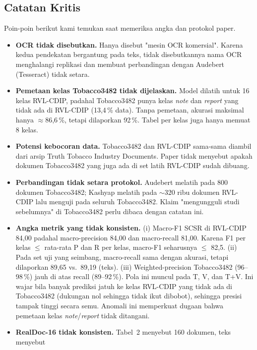 \subsection{Catatan Kritis}
Poin-poin berikut kami temukan saat memeriksa angka dan protokol paper.
\begin{itemize}
  \item \textbf{OCR tidak disebutkan.} Hanya disebut "mesin OCR komersial". Karena kedua
        pendekatan bergantung pada teks, tidak disebutkannya nama OCR menghalangi
        replikasi dan membuat perbandingan dengan Audebert (Tesseract) tidak setara.
  \item \textbf{Pemetaan kelas Tobacco3482 tidak dijelaskan.} Model dilatih untuk 16 kelas
        RVL-CDIP, padahal Tobacco3482 punya kelas \emph{note} dan \emph{report} yang tidak
        ada di RVL-CDIP (13,4\,\% data). Tanpa pemetaan, akurasi maksimal hanya
        $\approx$86,6\,\%, tetapi dilaporkan 92\,\%. Tabel per kelas juga hanya memuat
        8 kelas.
  \item \textbf{Potensi kebocoran data.} Tobacco3482 dan RVL-CDIP sama-sama diambil dari
        arsip Truth Tobacco Industry Documents. Paper tidak menyebut apakah dokumen
        Tobacco3482 yang juga ada di set latih RVL-CDIP sudah dibuang.
  \item \textbf{Perbandingan tidak setara protokol.} Audebert melatih pada 800 dokumen
        Tobacco3482; Kashyap melatih pada $\sim$320 ribu dokumen RVL-CDIP lalu menguji pada
        seluruh Tobacco3482. Klaim "mengungguli studi sebelumnya" di Tobacco3482 perlu
        dibaca dengan catatan ini.
  \item \textbf{Angka metrik yang tidak konsisten.}
        (i) Macro-F1 SCSR di RVL-CDIP 84,00 padahal macro-precision 84,00 dan macro-recall
        81,00. Karena F1 per kelas $\leq$ rata-rata P dan R per kelas, macro-F1 seharusnya
        $\leq$ 82,5.
        (ii) Pada set uji yang seimbang, macro-recall sama dengan akurasi, tetapi
        dilaporkan 89,65 vs.\ 89,19 (teks).
        (iii) Weighted-precision Tobacco3482 (96--98\,\%) jauh di atas recall (89--92\,\%).
        Pola ini muncul pada T, V, dan T+V. Ini wajar bila banyak prediksi jatuh ke kelas
        RVL-CDIP yang tidak ada di Tobacco3482 (dukungan nol sehingga tidak ikut
        dibobot), sehingga presisi tampak tinggi secara semu. Anomali ini memperkuat
        dugaan bahwa pemetaan kelas \emph{note}/\emph{report} tidak ditangani.
  \item \textbf{RealDoc-16 tidak konsisten.} Tabel~2 menyebut 160 dokumen, teks menyebut

\end{itemize}
